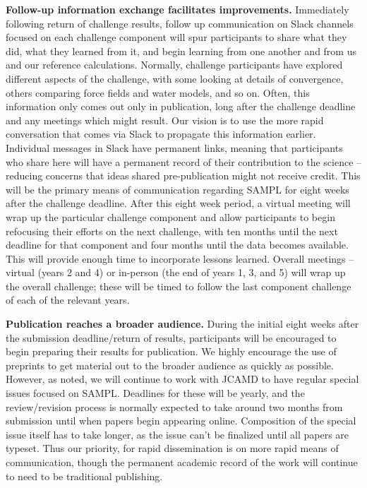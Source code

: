 \documentclass[11pt]{article}
\begin{document}
\textbf{Follow-up information exchange facilitates improvements.}
Immediately following return of challenge results, follow up communication on Slack channels focused on each challenge component will spur participants to share what they did, what they learned from it, and begin learning from one another and from us and our reference calculations.
Normally, challenge participants have explored different aspects of the challenge, with some looking at details of convergence, others comparing force fields and water models, and so on. 
Often, this information only comes out only in publication, long after the challenge deadline and any meetings which might result.
Our vision is to use the more rapid conversation that comes via Slack to propagate this information earlier. 
Individual messages in Slack have permanent links, meaning that participants who share here will have a permanent record of their contribution to the science -- reducing concerns that ideas shared pre-publication might not receive credit. 
This will be the primary means of communication regarding SAMPL for eight weeks after the challenge deadline.
After this eight week period, a virtual meeting will wrap up the particular challenge component and allow participants to begin refocusing their efforts on the next challenge, with ten months until the next deadline for that component and four months until the data becomes available. 
This will provide enough time to incorporate lessons learned.
Overall meetings -- virtual (years 2 and 4) or in-person (the end of years 1, 3, and 5) will wrap up the overall challenge; these will be timed to follow the last component challenge of each of the relevant years.

\textbf{Publication reaches a broader audience.}
During the initial eight weeks after the submission deadline/return of results, participants will be encouraged to begin preparing their results for publication.
We highly encourage the use of preprints to get material out to the broader audience as quickly as possible.
However, as noted, we will continue to work with JCAMD to have regular special issues focused on SAMPL. 
Deadlines for these will be yearly, and the review/revision process is normally expected to take around two months from submission until when papers begin appearing online. 
Composition of the special issue itself has to take longer, as the issue can't be finalized until all papers are typeset. 
Thus our priority, for rapid dissemination is on more rapid means of communication, though the permanent academic record of the work will continue to need to be traditional publishing.
\end{document}
